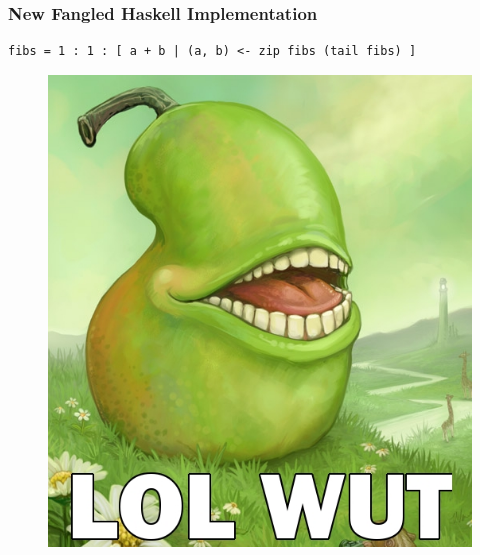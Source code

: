 \documentclass{beamer}
\begin{document}
    \lstset{language=Haskell}
    \begin{frame}[fragile=singleslide]
        \frametitle{New Fangled Haskell Implementation}

        \begin{lstlisting}
fibs = 1 : 1 : [ a + b | (a, b) <- zip fibs (tail fibs) ]
        \end{lstlisting}
    \end{frame}

    \begin{frame}[fragile=singleslide]
        \begin{figure}
            \centering
            \includegraphics[scale=0.35]{./fibs/images/lolwutpear.jpg}
        \end{figure}
    \end{frame}
\end{document}
